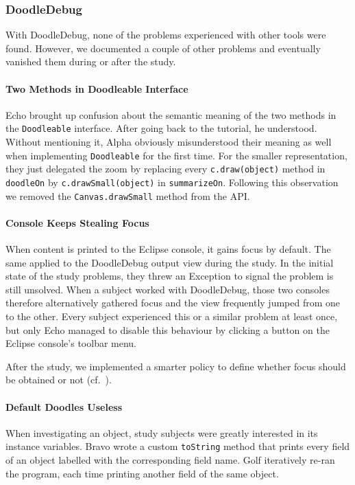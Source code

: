 \documentclass[english]{scrartcl}
\newcommand{\DD}{Dood\-le\-De\-bug\xspace}
\begin{document}
\subsubsection{DoodleDebug}
With \DD, none of the problems experienced with other tools were found.
However, we documented a couple of other problems and eventually vanished them during or after the study.

\paragraph{Two Methods in Doodleable Interface}
Echo brought up confusion about the semantic meaning of the two methods in the \texttt{Doodleable} interface.
After going back to the tutorial, he understood.
Without mentioning it, Alpha obviously misunderstood their meaning as well when implementing \texttt{Doodleable} for the first time.
For the smaller representation, they just delegated the zoom by replacing every \texttt{c.draw(object)} method in \texttt{doodleOn} by \texttt{c.drawSmall(object)} in \texttt{summarizeOn}.
Following this observation we removed the \texttt{Canvas.drawSmall} method from the API.

\paragraph{Console Keeps Stealing Focus}
When content is printed to the Eclipse console, it gains focus by default.
The same applied to the \DD output view during the study.
In the initial state of the study problems, they threw an Exception to signal the problem is still unsolved.
When a subject worked with \DD, those two consoles therefore alternatively gathered focus and the view frequently jumped from one to the other.
Every subject experienced this or a similar problem at least once, but only Echo managed to disable this behaviour by clicking a button on the Eclipse console's toolbar menu.

After the study, we implemented a smarter policy to define whether focus should be obtained or not (cf.~).

\paragraph{Default Doodles Useless}
When investigating an object, study subjects were greatly interested in its instance variables.
Bravo wrote a custom \texttt{toString} method that prints every field of an object labelled with the corresponding field name.
Golf iteratively re-ran the program, each time printing another field of the same object.
\end{document}
